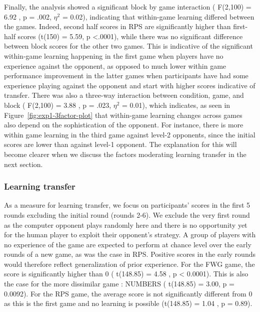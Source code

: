 \documentclass[man,floatsintext]{apa6}
\begin{document}
Finally, the analysis showed a significant block by game interaction ( F(2,100) = 6.92 , p = .002, \(\eta^{2}\) = 0.02), indicating that within-game learning differed between the games. Indeed, second half scores in RPS are significantly higher than first-half scores (t(150) = 5.59, p \textless{}.0001), while there was no significant difference between block scores for the other two games. This is indicative of the significant within-game learning happening in the first game when players have no experience against the opponent, as opposed to much lower within game performance improvement in the latter games when participants have had some experience playing against the opponent and start with higher scores indicative of transfer. There was also a three-way interaction between condition, game, and block ( F(2,100) = 3.88 , p = .023, \(\eta^{2}\) = 0.01), which indicates, as seen in Figure~\ref{fig:exp1-3factor-plot} that within-game learning changes across games also depend on the sophistication of the opponent. For instance, there is more within game learning in the third game against level-2 opponents, since the initial scores are lower than against level-1 opponent. The explanation for this will become clearer when we discuss the factors moderating learning transfer in the next section.

\hypertarget{learning-transfer}{%
\subsubsection{Learning transfer}\label{learning-transfer}}

As a measure for learning transfer, we focus on participants' scores in the first 5 rounds excluding the initial round (rounds 2-6). We exclude the very first round as the computer opponent plays randomly here and there is no opportunity yet for the human player to exploit their opponent's strategy. A group of players with no experience of the game are expected to perform at chance level over the early rounds of a new game, as was the case in RPS. Positive scores in the early rounds would therefore reflect generalization of prior experience. For the FWG game, the score is significantly higher than 0 ( t(148.85) = 4.58 , p \textless{} 0.0001). This is also the case for the more dissimilar game : NUMBERS ( t(148.85) = 3.00, p = 0.0092). For the RPS game, the average score is not significantly different from 0 as this is the first game and no learning is possible (t(148.85) = 1.04 , p = 0.89).
\end{document}
